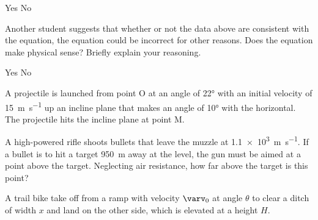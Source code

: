 \documentclass{../../../oss-ap12ibhl-print}
\begin{document}
\begin{questions}
\begin{parts}
\begin{subparts}
      \vspace{.1in}
      \underline{\hspace{.25in}} Yes\hspace{.5in}
      \underline{\hspace{.25in}} No

      \vspace{.1in}

      \subpart Another student suggests that whether or not the data above are
      consistent with the equation, the equation could be incorrect for other
      reasons. Does the equation make physical sense? Briefly explain your
      reasoning.

      \vspace{.1in}
      \underline{\hspace{.25in}} Yes\hspace{.5in}
      \underline{\hspace{.25in}} No
    \end{subparts}
  \end{parts}
  \newpage
  
  
  \question A projectile is launched from point O at an angle of \ang{22} with
  an initial velocity of \SI{15}{\metre\per\second} up an incline plane that
  makes an angle of \ang{10} with the horizontal. The projectile hits the
  incline plane at point M.
  \newpage
  
  \question A high-powered rifle shoots bullets that leave the muzzle at
  \SI{1.1e3}{\metre\per\second}. If a bullet is to hit a target
  \SI{950}{\metre} away at the level, the gun must be aimed at a point above
  the target. Neglecting air resistance, how far above the target is this
  point?
  \newpage

  \question A trail bike take off from a ramp with velocity $\bm{\varv}_0$ at
  angle $\theta$ to clear a ditch of width $x$ and land on the other side,
  which is elevated at a height $H$.
  \begin{parts}

\end{parts}
\end{questions}
\end{document}
